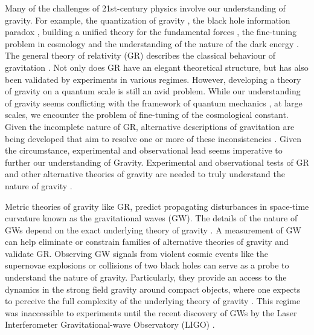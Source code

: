 Many of the challenges of 21st-century physics involve our understanding of gravity. For example, the quantization of gravity \cite{QG1,QG2,QG3,QG4}, the black hole information paradox \cite{BHIP1,BHIP2,BHIP3,BHIP0,BHIP4}, building a unified theory for the fundamental forces \cite{GUT}, the fine-tuning problem in cosmology \cite{CosmoConstant1,CosmoConstant2} and the understanding of the nature of the dark energy \cite{DarkEnergy} . The general theory of relativity (GR) describes the classical behaviour of gravitation \cite{OnGR}. Not only does GR have an elegant theoretical structure, but has also been validated by experiments in various regimes\cite{ReviewAlternativeTheories1}. However, developing a theory of gravity on a quantum scale is still an avid problem. While our understanding of gravity seems conflicting with the framework of quantum mechanics \cite{GRvsQM3,GRvsQM1,GRvsQM2}, at large scales, we encounter the problem of fine-tuning of the cosmological constant. Given the incomplete nature of GR, alternative descriptions of gravitation are being developed that aim to resolve one or more of these inconsistencies \cite{ReviewAlternativeTheories1,ReviewAlternativeTheories2,ModifiedGravity1,ModifiedGravity2}. Given the circumstance, experimental and observational lead seems imperative to further our understanding of Gravity. Experimental and observational tests of GR and other alternative theories of gravity are needed to truly understand the nature of gravity \cite{kipTGR1,kipTGR2,kipTGR3,TGRwithLISA}. 

Metric theories of gravity like GR, predict propagating disturbances in space-time curvature known as the gravitational waves (GW). The details of the nature of GWs depend on the exact underlying theory of gravity \cite{ReviewAlternativeTheories1,kipGWGR}.  A measurement of GW can help eliminate or constrain families of alternative theories of gravity and validate GR. Observing GW signals from violent cosmic events like the supernovae explosions \cite{GwSupernovae1,GwSupernovae2} or collisions of two black holes \cite{CBCGW1, CBCGW2} can serve as a probe to understand the nature of gravity. Particularly, they provide an access to the dynamics in the strong field gravity around compact objects, where one expects to perceive the full complexity of the underlying theory of gravity \cite{0264-9381-33-5-054001}. This regime was inaccessible to experiments until the recent discovery of GWs by the Laser Interferometer Gravitational-wave Observatory (LIGO) \cite{gw150914detection}. 


